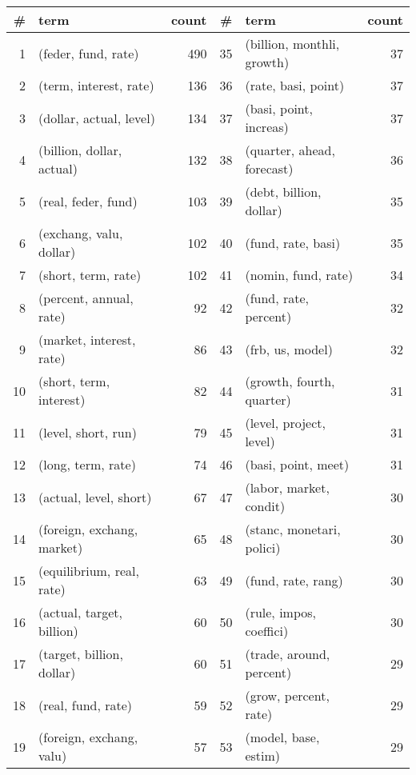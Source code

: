 \begin{tabular}{rlrrlr}
\toprule
  \# &                        term &  count &   \# &                         term &  count \\
\midrule
  1 &         (feder, fund, rate) &    490 &  35 &   (billion, monthli, growth) &     37 \\
  2 &      (term, interest, rate) &    136 &  36 &          (rate, basi, point) &     37 \\
  3 &     (dollar, actual, level) &    134 &  37 &       (basi, point, increas) &     37 \\
  4 &   (billion, dollar, actual) &    132 &  38 &   (quarter, ahead, forecast) &     36 \\
  5 &         (real, feder, fund) &    103 &  39 &      (debt, billion, dollar) &     35 \\
  6 &     (exchang, valu, dollar) &    102 &  40 &           (fund, rate, basi) &     35 \\
  7 &         (short, term, rate) &    102 &  41 &          (nomin, fund, rate) &     34 \\
  8 &     (percent, annual, rate) &     92 &  42 &        (fund, rate, percent) &     32 \\
  9 &    (market, interest, rate) &     86 &  43 &             (frb, us, model) &     32 \\
 10 &     (short, term, interest) &     82 &  44 &    (growth, fourth, quarter) &     31 \\
 11 &         (level, short, run) &     79 &  45 &      (level, project, level) &     31 \\
 12 &          (long, term, rate) &     74 &  46 &          (basi, point, meet) &     31 \\
 13 &      (actual, level, short) &     67 &  47 &      (labor, market, condit) &     30 \\
 14 &  (foreign, exchang, market) &     65 &  48 &    (stanc, monetari, polici) &     30 \\
 15 &   (equilibrium, real, rate) &     63 &  49 &           (fund, rate, rang) &     30 \\
 16 &   (actual, target, billion) &     60 &  50 &      (rule, impos, coeffici) &     30 \\
 17 &   (target, billion, dollar) &     60 &  51 &     (trade, around, percent) &     29 \\
 18 &          (real, fund, rate) &     59 &  52 &        (grow, percent, rate) &     29 \\
 19 &    (foreign, exchang, valu) &     57 &  53 &         (model, base, estim) &     29 \\

\end{tabular}
